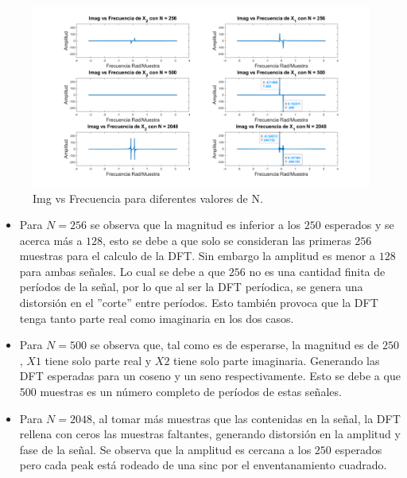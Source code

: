 \documentclass[letterpaper,onecolumn,10pt,journal,final]{IEEEtran}
\begin{document}
\begin{enumerate}[1)]
\begin{enumerate}
\begin{figure}[H]
\centering
\includegraphics[width=1 \linewidth]{Figuras/I3)c.png}
\caption{Img vs Frecuencia para diferentes valores de N.}
\label{fig:I3)b}
\end{figure}

\begin{itemize}
    \item 
    Para $N=256$ se observa que la magnitud es inferior a los $250$ esperados y se acerca más a $128$, esto se debe a que solo se consideran las primeras $256$ muestras para el calculo de la DFT. Sin embargo la amplitud es menor a $128$ para ambas señales. Lo cual se debe a que $256$ no es una cantidad finita de períodos de la señal, por lo que al ser la DFT períodica, se genera una distorsión en el ''corte'' entre períodos. Esto también provoca que la DFT tenga tanto parte real como imaginaria en los dos casos.
    \item
    Para $N=500$ se observa que, tal como es de esperarse, la magnitud es de $250$, $X1$ tiene solo parte real y $X2$ tiene solo parte imaginaria. Generando las DFT esperadas para un coseno y un seno respectivamente. Esto se debe a que 500 muestras es un número completo de períodos de estas señales.
    \item
    Para $N=2048$, al tomar más muestras que las contenidas en la señal, la DFT rellena con ceros las muestras faltantes, generando distorsión en la amplitud y fase de la señal. Se observa que la amplitud es cercana a los $250$ esperados pero cada peak está rodeado de una sinc por el enventanamiento cuadrado.
\end{itemize}

\end{enumerate}
\end{enumerate}
%
%
\end{document}
